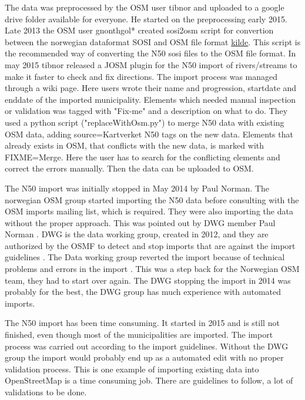 The data was preprocessed by the OSM user tibnor and uploaded to a google drive folder available for everyone. He started on the preprocessing early 2015. Late 2013 the OSM user gnonthgol* created sosi2osm script for convertion between the norwegian dataformat SOSI and OSM file format \href{https://lists.nuug.no/pipermail/kart/2013-October/004314.html}{kilde}. This script is the recommended way of converting the N50 sosi files to the OSM file format. In may 2015 tibnor released a JOSM plugin for the N50 import of rivers/streams to make it faster to check and fix directions. The import process was managed through a wiki page. Here users wrote their name and progression, startdate and enddate of the imported municipality. Elements which needed manual inspection or validation was tagged with "Fix-me" and a description on what to do. They used a python script ("replaceWithOsm.py") to merge N50 data with existing OSM data, adding source=Kartverket N50 tags on the new data. Elements that already exists in OSM, that conflicts with the new data, is marked with FIXME=Merge. Here the user has to search for the conflicting elements and correct the errors manually. Then the data can be uploaded to OSM. 

The N50 import was initially stopped in May 2014 by Paul Norman. The norwegian OSM group started importing the N50 data before consulting with the OSM imports mailing list, which is required. They were also importing the data without the proper approach. This was pointed out by DWG member Paul Norman \cite{Mehus2014}.  DWG is the data working group, created in 2012, and they are authorized by the OSMF to detect and stop imports that are against the import guidelines \cite{OSMDWG}. The Data working group reverted the import because of technical problems and errors in the import \cite{Didriksen2014}. This was a step back for the Norwegian OSM team, they had to start over again. The DWG stopping the import in 2014 was probably for the best, the DWG group has much experience with automated imports. 

The N50 import has been time consuming. It started in 2015 and is still not finished, even though most of the municipalities are imported. The import process was  carried out according to the import guidelines. Without the DWG group the import would probably end up as a automated edit with no proper validation process. This is one example of importing existing data into OpenStreetMap is a time consuming job. There are guidelines to follow, a lot of validations to be done. 


